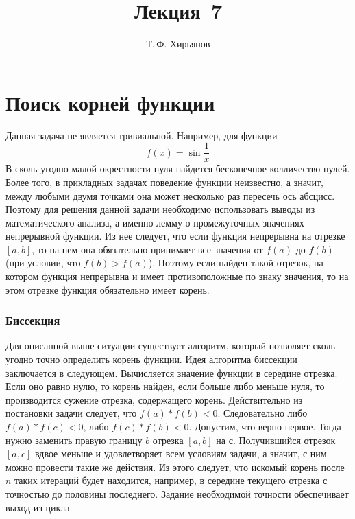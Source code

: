 \documentclass[a4paper, fleqn]{article}
\title{Лекция \textnumero\,7}
\author{Т.\,Ф. Хирьянов}
\date{}
\begin{document}
	\maketitle

\section*{Поиск корней функции}

Данная задача не является тривиальной. Например, для функции
\[f(x) = \sin{\frac{1}{x}}\]
В сколь угодно малой окрестности нуля найдется бесконечное колличество нулей. Более того, в прикладных задачах поведение функции неизвестно, а значит, между любыми двумя точками она может несколько раз пересечь ось абсцисс. Поэтому для решения данной задачи необходимо использовать выводы из математического анализа, а именно лемму о промежуточных значениях непрерывной функции. Из нее следует, что если функция непрерывна на отрезке $[a, b]$, то на нем она обязательно принимает все значения от $f(a)$ до $f(b)$ (при условии, что $f(b) > f(a)$). Поэтому если найден такой отрезок, на котором функция непрерывна и имеет противоположные по знаку значения, то на этом отрезке функция обязательно имеет корень.

\subsubsection*{Биссекция}

Для описанной выше ситуации существует алгоритм, который позволяет сколь угодно точно определить корень функции. Идея алгоритма биссекции заключается в следующем. Вычисляется значение функции в середине отрезка. Если оно равно нулю, то корень найден, если больше либо меньше нуля, то производится сужение отрезка, содержащего корень. Действительно из постановки задачи следует, что $f(a)*f(b) < 0$. Следовательно либо $f(a)*f(c) < 0$, либо $f(c)*f(b) < 0$. Допустим, что верно первое. Тогда нужно заменить правую границу $b$ отрезка $[a, b]$ на с. Получившийся отрезок $[a, c]$ вдвое меньше и удовлетворяет всем условиям задачи, а значит, с ним можно провести такие же действия. Из этого следует, что искомый корень после $n$ таких итераций будет находится, например, в середине текущего отрезка с точностью до половины последнего. Задание необходимой точности обеспечивает выход из цикла.

%
\end{document}
